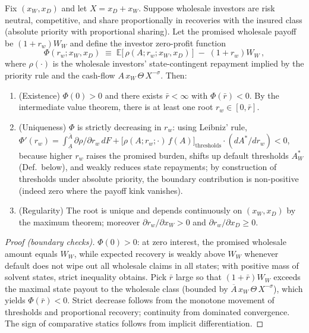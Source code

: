 \documentclass[12pt]{article}
\begin{document}
\begin{lemma}\label{lem:wholesale}
Fix $(x_W,x_D)$ and let $X=x_D+x_W$. Suppose wholesale investors are risk neutral, competitive, and share proportionally in recoveries with the insured class (absolute priority with proportional sharing). Let the promised wholesale payoff be $(1+r_w)W_W$ and define the investor zero-profit function
\begin{equation}
\Phi(r_w; x_W,x_D)\;\equiv\; \mathbb E\big[\,\rho(A;r_w; x_W,x_D)\,\big] \; - \; (1+r_w)W_W \, ,
\end{equation}
where $\rho(\cdot)$ is the wholesale investors' state-contingent repayment implied by the priority rule and the cash-flow $A\,x_W\,\Theta\,X^{-\sigma}$. Then:
\begin{enumerate}
\item (Existence) $\Phi(0)>0$ and there exists $\bar r<\infty$ with $\Phi(\bar r)<0$. By the intermediate value theorem, there is at least one root $r_w\in[0,\bar r]$.
\item (Uniqueness) $\Phi$ is strictly decreasing in $r_w$: using Leibniz' rule, $\Phi'(r_w)=\int_{\underline A}^{\overline A}\partial \rho/\partial r_w\, dF + \big[\rho(A;r_w;\cdot)\,f(A)\big]_{\text{thresholds}}\!\cdot (dA^*/dr_w) < 0$, because higher $r_w$ raises the promised burden, shifts up default thresholds $A_W^*$ (Def.~below), and weakly reduces state repayments; by construction of thresholds under absolute priority, the boundary contribution is non-positive (indeed zero where the payoff kink vanishes).
\item (Regularity) The root is unique and depends continuously on $(x_W,x_D)$ by the maximum theorem; moreover $\partial r_w/\partial x_W>0$ and $\partial r_w/\partial x_D\ge 0$.
\end{enumerate}
\end{lemma}
\begin{proof}[Proof (boundary checks)]
$\Phi(0)>0$: at zero interest, the promised wholesale amount equals $W_W$, while expected recovery is weakly above $W_W$ whenever default does not wipe out all wholesale claims in all states; with positive mass of solvent states, strict inequality obtains. Pick $\bar r$ large so that $(1+\bar r)W_W$ exceeds the maximal state payout to the wholesale class (bounded by $\overline A\,x_W\,\Theta\,X^{-\sigma}$), which yields $\Phi(\bar r)<0$. Strict decrease follows from the monotone movement of thresholds and proportional recovery; continuity from dominated convergence. The sign of comparative statics follows from implicit differentiation.
\end{proof}
\end{document}
